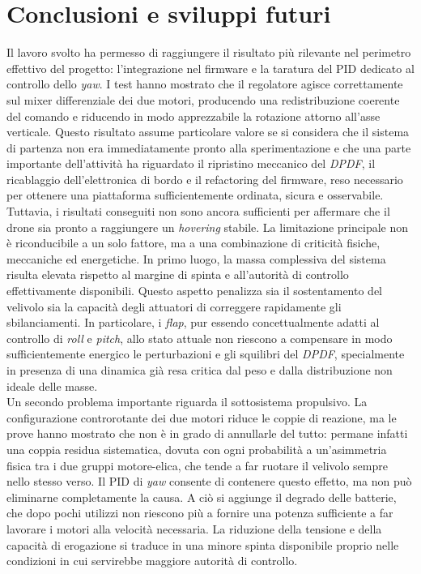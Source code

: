 \documentclass[11pt]{report}
\begin{document}
	\section*{Conclusioni e sviluppi futuri}
	Il lavoro svolto ha permesso di raggiungere il risultato più rilevante nel perimetro effettivo del progetto: l'integrazione nel firmware e la taratura del PID dedicato al controllo dello \textit{yaw}. I test hanno mostrato che il regolatore agisce correttamente sul mixer differenziale dei due motori, producendo una redistribuzione coerente del comando e riducendo in modo apprezzabile la rotazione attorno all'asse verticale. Questo risultato assume particolare valore se si considera che il sistema di partenza non era immediatamente pronto alla sperimentazione e che una parte importante dell'attività ha riguardato il ripristino meccanico del \textit{DPDF}, il ricablaggio dell'elettronica di bordo e il refactoring del firmware, reso necessario per ottenere una piattaforma sufficientemente ordinata, sicura e osservabile.\\
	Tuttavia, i risultati conseguiti non sono ancora sufficienti per affermare che il drone sia pronto a raggiungere un \textit{hovering} stabile. La limitazione principale non è riconducibile a un solo fattore, ma a una combinazione di criticità fisiche, meccaniche ed energetiche. In primo luogo, la massa complessiva del sistema risulta elevata rispetto al margine di spinta e all'autorità di controllo effettivamente disponibili. Questo aspetto penalizza sia il sostentamento del velivolo sia la capacità degli attuatori di correggere rapidamente gli sbilanciamenti. In particolare, i \textit{flap}, pur essendo concettualmente adatti al controllo di \textit{roll} e \textit{pitch}, allo stato attuale non riescono a compensare in modo sufficientemente energico le perturbazioni e gli squilibri del \textit{DPDF}, specialmente in presenza di una dinamica già resa critica dal peso e dalla distribuzione non ideale delle masse.\\
	Un secondo problema importante riguarda il sottosistema propulsivo. La configurazione controrotante dei due motori riduce le coppie di reazione, ma le prove hanno mostrato che non è in grado di annullarle del tutto: permane infatti una coppia residua sistematica, dovuta con ogni probabilità a un'asimmetria fisica tra i due gruppi motore-elica, che tende a far ruotare il velivolo sempre nello stesso verso. Il PID di \textit{yaw} consente di contenere questo effetto, ma non può eliminarne completamente la causa. A ciò si aggiunge il degrado delle batterie, che dopo pochi utilizzi non riescono più a fornire una potenza sufficiente a far lavorare i motori alla velocità necessaria. La riduzione della tensione e della capacità di erogazione si traduce in una minore spinta disponibile proprio nelle condizioni in cui servirebbe maggiore autorità di controllo.\\
\end{document}
